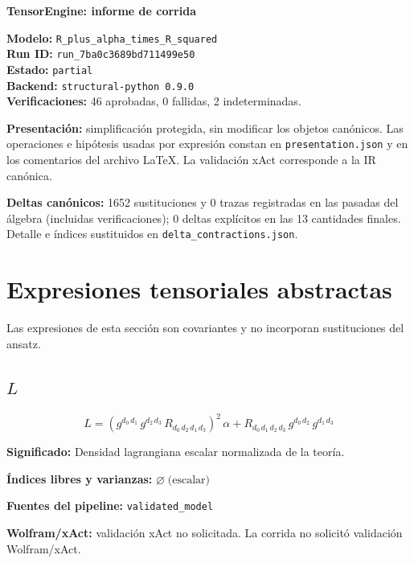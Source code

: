 \documentclass[11pt]{article}
\begin{document}
\begin{center}
{\Large\bfseries TensorEngine: informe de corrida}
\end{center}
\textbf{Modelo:} \texttt{R\_plus\_alpha\_times\_R\_squared}\\
\textbf{Run ID:} \texttt{run\_7ba0c3689bd711499e50}\\
\textbf{Estado:} \texttt{partial}\\
\textbf{Backend:} \texttt{structural-python 0.9.0}\\
\textbf{Verificaciones:} 46 aprobadas, 0 fallidas, 2 indeterminadas.
\par\smallskip
\textbf{Presentación:} simplificación protegida, sin modificar los objetos canónicos. Las operaciones e hipótesis usadas por expresión constan en \texttt{presentation.json} y en los comentarios del archivo LaTeX. La validación xAct corresponde a la IR canónica.\par
\textbf{Deltas canónicos:} 1652 sustituciones y 0 trazas registradas en las pasadas del álgebra (incluidas verificaciones); 0 deltas explícitos en las 13 cantidades finales. Detalle e índices sustituidos en \texttt{delta\_contractions.json}.\par
\section*{Expresiones tensoriales abstractas}
Las expresiones de esta sección son covariantes y no incorporan sustituciones del ansatz.
\subsection*{$ L $}
\begin{dmath*}[breakdepth={5}]
L = {\left(g{}^{d_{0}\,d_{1}}\,g{}^{d_{2}\,d_{3}}\,R{}_{d_{0}\,d_{2}\,d_{1}\,d_{3}}\right)}^{2}\,\alpha + R{}_{d_{0}\,d_{1}\,d_{2}\,d_{3}}\,g{}^{d_{0}\,d_{2}}\,g{}^{d_{1}\,d_{3}}
\end{dmath*}
\par\vspace{1.2\baselineskip}\noindent
\begin{minipage}{\linewidth}
\textbf{Significado:} Densidad lagrangiana escalar normalizada de la teoría.\par
\textbf{Índices libres y varianzas:} $ \varnothing\;\text{(escalar)} $\par
\textbf{Fuentes del pipeline:} \texttt{validated\_model}\par
\textbf{Wolfram/xAct:} validación xAct no solicitada. La corrida no solicitó validación Wolfram/xAct.\par
\end{minipage}
\end{document}
